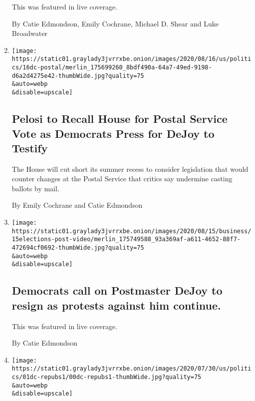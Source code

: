 \begin{enumerate}
  This was featured in live coverage.

  By Catie Edmondson, Emily Cochrane, Michael D. Shear and Luke
  Broadwater
\item
  \href{/2020/08/16/us/politics/coronavirus-postal-service-stimulus-bill.html}{}

  \texttt{[image: https://static01.graylady3jvrrxbe.onion/images/2020/08/16/us/politics/16dc-postal/merlin\_175699260\_8bdf490a-64a7-49ed-9198-d6a2d4275e42-thumbWide.jpg?quality=75\\\&auto=webp\\\&disable=upscale]}

  \hypertarget{pelosi-to-recall-house-for-postal-service-vote-as-democrats-press-for-dejoy-to-testify}{%
  \subsection{Pelosi to Recall House for Postal Service Vote as
  Democrats Press for DeJoy to
  Testify}\label{pelosi-to-recall-house-for-postal-service-vote-as-democrats-press-for-dejoy-to-testify}}

  The House will cut short its summer recess to consider legislation
  that would counter changes at the Postal Service that critics say
  undermine casting ballots by mail.

  By Emily Cochrane and Catie Edmondson
\item
  \href{/live/2020/08/16/us/election-trump-vs-biden/democrats-call-on-postmaster-dejoy-to-resign-as-protests-against-him-continue}{}

  \texttt{[image: https://static01.graylady3jvrrxbe.onion/images/2020/08/15/business/15elections-post-video/merlin\_175749588\_93a369af-a611-4652-88f7-472694cf0692-thumbWide.jpg?quality=75\\\&auto=webp\\\&disable=upscale]}

  \hypertarget{democrats-call-on-postmaster-dejoy-to-resign-as-protests-against-him-continue}{%
  \subsection{Democrats call on Postmaster DeJoy to resign as protests
  against him
  continue.}\label{democrats-call-on-postmaster-dejoy-to-resign-as-protests-against-him-continue}}

  This was featured in live coverage.

  By Catie Edmondson
\item
  \href{/2020/08/01/us/politics/trump-suburban-voters-republicans-house.html}{}

  \texttt{[image: https://static01.graylady3jvrrxbe.onion/images/2020/07/30/us/politics/01dc-repubs1/00dc-repubs1-thumbWide.jpg?quality=75\\\&auto=webp\\\&disable=upscale]}


\end{enumerate}
